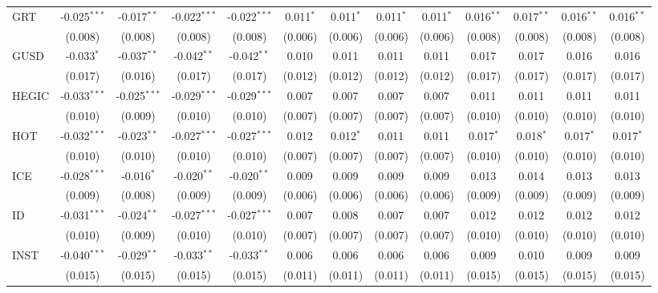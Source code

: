 \begin{table}[!htbp]
\begin{tabular}{@{\extracolsep{5pt}}lcccccccccccc}
 GRT & -0.025$^{***}$ & -0.017$^{**}$ & -0.022$^{***}$ & -0.022$^{***}$ & 0.011$^{*}$ & 0.011$^{*}$ & 0.011$^{*}$ & 0.011$^{*}$ & 0.016$^{**}$ & 0.017$^{**}$ & 0.016$^{**}$ & 0.016$^{**}$ \\
  & (0.008) & (0.008) & (0.008) & (0.008) & (0.006) & (0.006) & (0.006) & (0.006) & (0.008) & (0.008) & (0.008) & (0.008) \\
 GUSD & -0.033$^{*}$ & -0.037$^{**}$ & -0.042$^{**}$ & -0.042$^{**}$ & 0.010$^{}$ & 0.011$^{}$ & 0.011$^{}$ & 0.011$^{}$ & 0.017$^{}$ & 0.017$^{}$ & 0.016$^{}$ & 0.016$^{}$ \\
  & (0.017) & (0.016) & (0.017) & (0.017) & (0.012) & (0.012) & (0.012) & (0.012) & (0.017) & (0.017) & (0.017) & (0.017) \\
 HEGIC & -0.033$^{***}$ & -0.025$^{***}$ & -0.029$^{***}$ & -0.029$^{***}$ & 0.007$^{}$ & 0.007$^{}$ & 0.007$^{}$ & 0.007$^{}$ & 0.011$^{}$ & 0.011$^{}$ & 0.011$^{}$ & 0.011$^{}$ \\
  & (0.010) & (0.009) & (0.010) & (0.010) & (0.007) & (0.007) & (0.007) & (0.007) & (0.010) & (0.010) & (0.010) & (0.010) \\
 HOT & -0.032$^{***}$ & -0.023$^{**}$ & -0.027$^{***}$ & -0.027$^{***}$ & 0.012$^{}$ & 0.012$^{*}$ & 0.011$^{}$ & 0.011$^{}$ & 0.017$^{*}$ & 0.018$^{*}$ & 0.017$^{*}$ & 0.017$^{*}$ \\
  & (0.010) & (0.010) & (0.010) & (0.010) & (0.007) & (0.007) & (0.007) & (0.007) & (0.010) & (0.010) & (0.010) & (0.010) \\
 ICE & -0.028$^{***}$ & -0.016$^{*}$ & -0.020$^{**}$ & -0.020$^{**}$ & 0.009$^{}$ & 0.009$^{}$ & 0.009$^{}$ & 0.009$^{}$ & 0.013$^{}$ & 0.014$^{}$ & 0.013$^{}$ & 0.013$^{}$ \\
  & (0.009) & (0.008) & (0.009) & (0.009) & (0.006) & (0.006) & (0.006) & (0.006) & (0.009) & (0.009) & (0.009) & (0.009) \\
 ID & -0.031$^{***}$ & -0.024$^{**}$ & -0.027$^{***}$ & -0.027$^{***}$ & 0.007$^{}$ & 0.008$^{}$ & 0.007$^{}$ & 0.007$^{}$ & 0.012$^{}$ & 0.012$^{}$ & 0.012$^{}$ & 0.012$^{}$ \\
  & (0.010) & (0.009) & (0.010) & (0.010) & (0.007) & (0.007) & (0.007) & (0.007) & (0.010) & (0.010) & (0.010) & (0.010) \\
 INST & -0.040$^{***}$ & -0.029$^{**}$ & -0.033$^{**}$ & -0.033$^{**}$ & 0.006$^{}$ & 0.006$^{}$ & 0.006$^{}$ & 0.006$^{}$ & 0.009$^{}$ & 0.010$^{}$ & 0.009$^{}$ & 0.009$^{}$ \\
  & (0.015) & (0.015) & (0.015) & (0.015) & (0.011) & (0.011) & (0.011) & (0.011) & (0.015) & (0.015) & (0.015) & (0.015) \\

\end{tabular}
\end{table}
